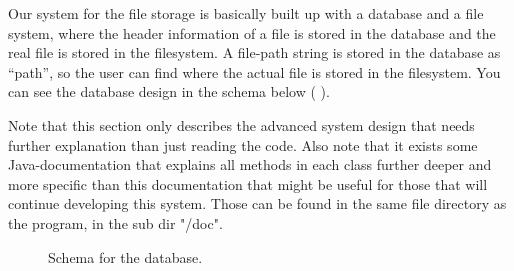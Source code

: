 Our system for the file storage is basically built up with a database and a file system, where the header information of a file is stored in the database and the real file is stored in the filesystem. A file-path string is stored in the database as “path”, so the user can find where the actual file is stored in the filesystem. You can see the database design in the schema below ( ). 

Note that this section only describes the advanced system design that needs further explanation than just reading the code. Also note that it exists some Java-documentation that explains all methods in each class further deeper and more specific than this documentation that might be useful for those that will continue developing this system. Those can be found in the same file directory as the program, in the sub dir "/doc".

\begin{figure}[htb]
\caption{Schema for the database.}
\label{fig:dat_databaseSchema}
\end{figure}

\FloatBarrier

